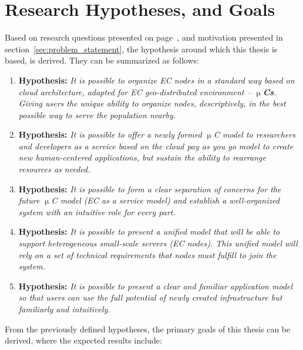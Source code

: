 \section{Research Hypotheses, and Goals}\label{sec:research_hyphotesis_and_golas}
%
Based on research questions presented on page~\pageref{questions}, and motivation presented in section~\ref{sec:problem_statement}, the hypothesis around which this thesis is based, is derived. They can be summarized as follows:

\begin{enumerate}[start=1,label={(\bfseries \arabic*)}]
	\item \textbf{Hypothesis:} \textit{It is possible to organize EC nodes in a standard way based on cloud architecture, adapted for EC geo-distributed environment -- \textbf{$\upmu$Cs}. Giving users the unique ability to organize nodes, descriptively, in the best possible way to serve the population nearby.}
	\item \textbf{Hypothesis:} \textit{It is possible to offer a newly formed $\upmu$C model to researchers and developers as a service based on the cloud pay as you go model to create new human-centered applications, but sustain the ability to rearrange resources as needed.}
	\item \textbf{Hypothesis:} \textit{It is possible to form a clear separation of concerns for the future $\upmu$C model (EC as a service model) and establish a well-organized system with an intuitive role for every part.} 
	\item \textbf{Hypothesis:} \textit{It is possible to present a unified model that will be able to support heterogeneous small-scale servers (EC nodes). This unified model will rely on a set of technical requirements that nodes must fulfill to join the system.}
	\item \textbf{Hypothesis:} \textit{It is possible to present a clear and familiar application model so that users can use the full potential of newly created infrastructure but familiarly and intuitively.}
\end{enumerate}

\noindent
From the previously defined hypotheses, the primary goals of this thesis can be derived, where the expected results include:

